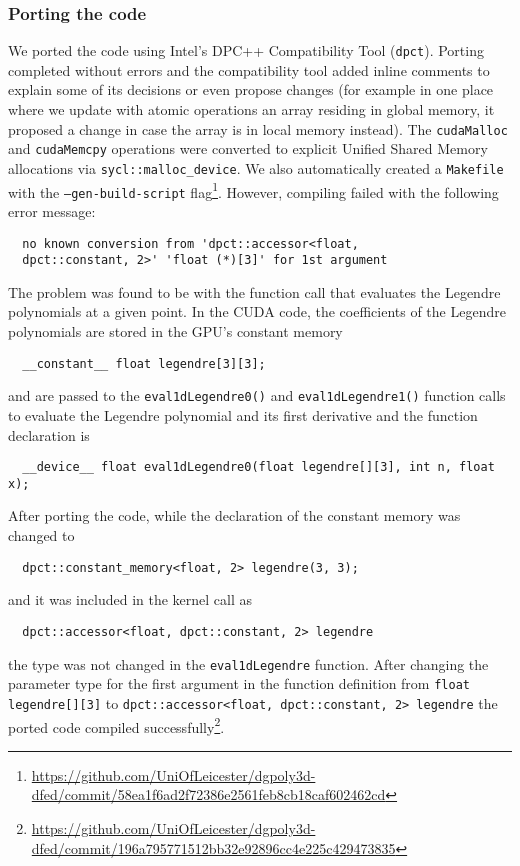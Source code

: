 \documentclass[../main]{subfiles}
\begin{document}
\subsubsection{Porting the code}\label{sec:dgpoly3d_porting}
We ported the code using Intel's DPC++ Compatibility Tool (\texttt{dpct}).
Porting completed without errors and the compatibility tool added inline comments to explain some of its decisions or even propose changes (for example in one place where we update with atomic operations an array residing in global memory, it proposed a change in case the array is in local memory instead).
The \texttt{cudaMalloc} and \texttt{cudaMemcpy} operations were converted to explicit Unified Shared Memory allocations via \texttt{sycl::malloc\_device}.
We also automatically created a \texttt{Makefile} with the \texttt{--gen-build-script} flag\footnote{\url{https://github.com/UniOfLeicester/dgpoly3d-dfed/commit/58ea1f6ad2f72386e2561feb8cb18caf602462cd}}.
However, compiling failed with the following error message:
\begin{verbatim}
  no known conversion from 'dpct::accessor<float,
  dpct::constant, 2>' 'float (*)[3]' for 1st argument
\end{verbatim}
The problem was found to be with the function call that evaluates the Legendre polynomials at a given point.
In the CUDA code, the coefficients of the Legendre polynomials are stored in the GPU's constant memory
\begin{verbatim}
  __constant__ float legendre[3][3];
\end{verbatim}
and are passed to the \texttt{eval1dLegendre0()} and \texttt{eval1dLegendre1()} function calls to evaluate the Legendre polynomial and its first derivative and the function declaration is
\begin{verbatim}
  __device__ float eval1dLegendre0(float legendre[][3], int n, float x);
\end{verbatim}
After porting the code, while the declaration of the constant memory was changed to
\begin{verbatim}
  dpct::constant_memory<float, 2> legendre(3, 3);
\end{verbatim}
and it was included in the kernel call as
\begin{verbatim}
  dpct::accessor<float, dpct::constant, 2> legendre
\end{verbatim}
the type was not changed in the \texttt{eval1dLegendre} function.
After changing the parameter type for the first argument in the function definition from \texttt{float legendre[][3]} to \texttt{dpct::accessor<float, dpct::constant, 2> legendre} the ported code compiled successfully\footnote{\url{https://github.com/UniOfLeicester/dgpoly3d-dfed/commit/196a795771512bb32e92896cc4e225c429473835}}.
\end{document}

